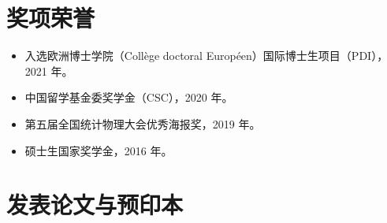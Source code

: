 \documentclass[11pt,a4paper]{article}
\begin{document}
\section{奖项荣誉}
\begin{itemize}
\item 入选欧洲博士学院（Collège doctoral Européen）国际博士生项目（PDI），2021 年。
\item 中国留学基金委奖学金（CSC），2020 年。
\item 第五届全国统计物理大会优秀海报奖，2019 年。
\item 硕士生国家奖学金，2016 年。
\end{itemize}

\newpage
\section{发表论文与预印本}
\end{document}
